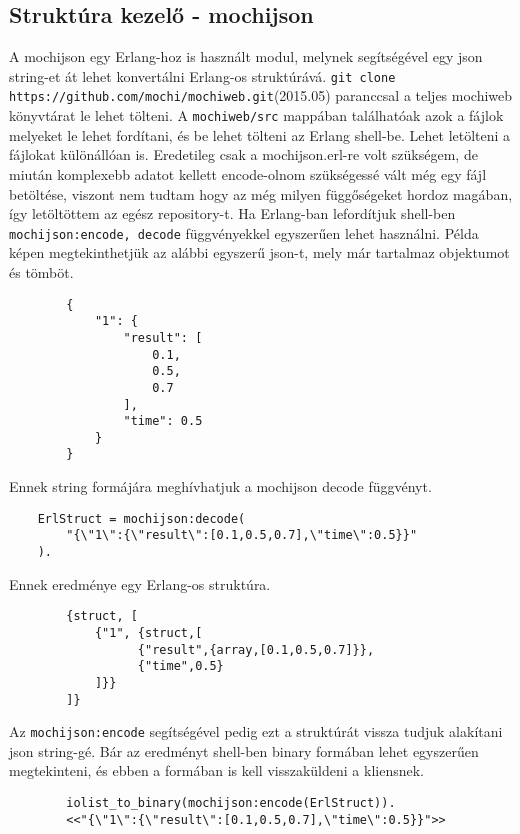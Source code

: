 \subsection{Struktúra kezelő - mochijson \label{subsec:mochijson}}
	A mochijson egy Erlang-hoz is használt modul, melynek segítségével egy json string-et át lehet konvertálni Erlang-os struktúrává. \newline 
	\texttt{git clone https://github.com/mochi/mochiweb.git}(2015.05)
	paranccsal a teljes mochiweb könyvtárat le lehet tölteni. A \texttt{mochiweb/src} mappában találhatóak azok a fájlok melyeket le lehet fordítani, és be lehet tölteni az Erlang shell-be. Lehet letölteni a fájlokat különállóan is. \newline
	Eredetileg csak a mochijson.erl-re volt szükségem, de miután komplexebb adatot kellett encode-olnom szükségessé vált még egy fájl betöltése, viszont nem tudtam hogy az még milyen függőségeket hordoz magában, így letöltöttem az egész repository-t. \newline
	Ha Erlang-ban lefordítjuk shell-ben \texttt{mochijson:encode, decode} függvényekkel egyszerűen lehet használni.\newline 
	Példa képen megtekinthetjük az alábbi egyszerű json-t, mely már tartalmaz objektumot és tömböt.
	\begin{verbatim}
		{
		    "1": {
		        "result": [
		            0.1,
		            0.5,
		            0.7
		        ],
		        "time": 0.5
		    }
		}
	\end{verbatim}
	Ennek string formájára meghívhatjuk a mochijson decode függvényt.
	\begin{verbatim}
	ErlStruct = mochijson:decode(
	    "{\"1\":{\"result\":[0.1,0.5,0.7],\"time\":0.5}}"
	).
	\end{verbatim}
	Ennek eredménye egy Erlang-os struktúra.
	\begin{verbatim}
		{struct, [
		    {"1", {struct,[
		          {"result",{array,[0.1,0.5,0.7]}},
		          {"time",0.5}
		    ]}}
		]}
	\end{verbatim}
	Az \texttt{mochijson:encode} segítségével pedig ezt a struktúrát vissza tudjuk alakítani json string-gé. Bár az eredményt shell-ben binary formában lehet egyszerűen megtekinteni, és ebben a formában is kell visszaküldeni a kliensnek. 
	\begin{verbatim}
		iolist_to_binary(mochijson:encode(ErlStruct)).
		<<"{\"1\":{\"result\":[0.1,0.5,0.7],\"time\":0.5}}">>
	\end{verbatim}


